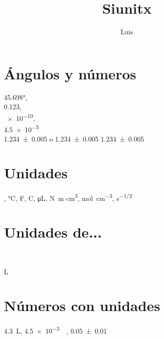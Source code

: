 \documentclass[20pt,a4paper]{extarticle}
\title{Siunitx}
\author{Luis}
\date{}
\begin{document}
\maketitle
\section{\'Angulos y n\'umeros}
\ang{45.698},\\
\num{0.123},\\
\num{e-10},\\
\num{4.5e-5}\\
\num{1.234(5)} o \num{1.234 \pm 0.005}
\num[separate-uncertainty = true]{1.234(5)}


\section{Unidades}
\si{\Molar}, 
\si{\degreeCelsius},
\si{\farad}, 
\si{\coulomb}, 
\si{\micro\liter}, 
\si{\newton\meter}
\si{\cubic\centi\meter}, 
\si{\mole\per\cubic\centi\meter}, 
\si{\second^{-1/2}}


\section{Unidades de...}
\si{\Molar{}}

\si{\liter{}}

\section{N\'umeros con unidades}
\SI{4.3}{\liter}, 
\SI{4.5e-3}{\Molar{}}, 
\SI{0.05 \pm 0.01}{\Molar{}}
\end{document}

